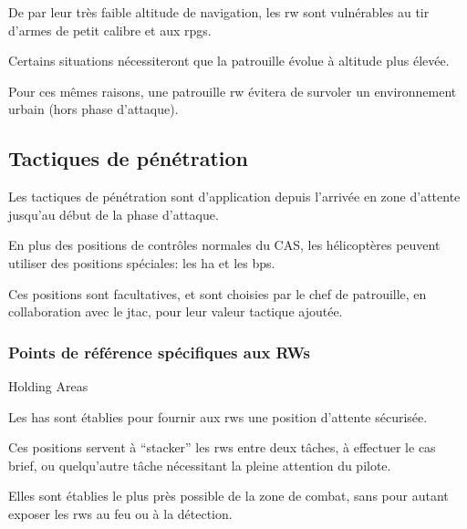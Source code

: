 	\begin{e2}
		\item De par leur très faible altitude de navigation, les \gls{rw} sont vulnérables au tir d'armes de petit calibre et aux \glspl{rpg}.
		\item Certains situations nécessiteront que la patrouille évolue à altitude plus élevée.
		\item Pour ces mêmes raisons, une patrouille \gls{rw} évitera de survoler un environnement urbain (hors phase d'attaque).
	\end{e2}

\ed

\subsection{Tactiques de pénétration}

\e
	\item Les tactiques de pénétration sont d'application depuis l'arrivée en zone d'attente jusqu'au début de la phase d'attaque.
	\item En plus des positions de contrôles normales du CAS, les hélicoptères peuvent utiliser des positions spéciales: les \gls{ha} et les \glspl{bp}.
	\item Ces positions sont facultatives, et sont choisies par le chef de patrouille, en collaboration avec le \gls{jtac}, pour leur valeur tactique ajoutée.
\ed

\subsubsection{Points de référence spécifiques aux RWs}

\e
	\item Holding Areas

	\ee
		\item Les \glspl{ha} sont établies pour fournir aux \glspl{rw} une position d'attente sécurisée.
		\item Ces positions servent à “stacker” les \glspl{rw} entre deux tâches, à effectuer le \gls{cas} brief, ou quelqu'autre tâche nécessitant la pleine attention du pilote.
		\item Elles sont établies le plus près possible de la zone de combat, sans pour autant exposer les \glspl{rw} au feu ou à la détection.
	\ed


